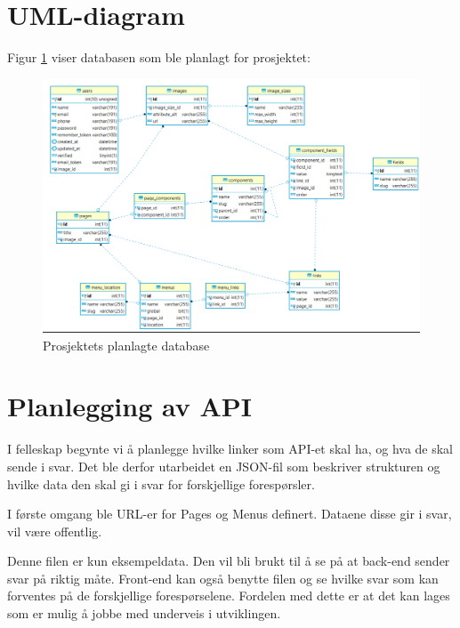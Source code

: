 \section{UML-diagram}
Figur \ref{fig:database} viser databasen som ble planlagt for prosjektet:
\begin{figure}[H]
    \centering
    \includegraphics[width=\textwidth]{planlegging-av-database.png}
    \caption{Prosjektets planlagte database}
    \label{fig:database}
\end{figure}

\section{Planlegging av API}
I felleskap begynte vi å planlegge hvilke linker som API-et skal ha, og hva de skal sende i svar. Det ble derfor utarbeidet en JSON-fil som beskriver strukturen og hvilke data den skal gi i svar for forskjellige forespørsler.

I første omgang ble URL-er for Pages og Menus definert. Dataene disse gir i svar, vil være offentlig. 






Denne filen er kun eksempeldata. Den vil bli brukt til å se på at back-end sender svar på riktig måte. Front-end kan også benytte filen og se hvilke svar som kan forventes på de forskjellige forespørselene. Fordelen med dette er at det kan lages  som er mulig å jobbe med underveis i utviklingen.

